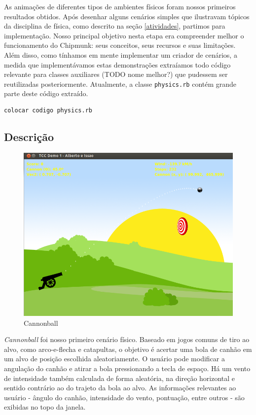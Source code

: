 As animações de diferentes tipos de ambientes físicos foram nossos primeiros resultados obtidos. Após desenhar alguns cenários simples que ilustravam tópicos da disciplina de física, como descrito na seção \ref{atividades}, partimos para implementação. Nosso principal objetivo nesta etapa era compreender melhor o funcionamento do Chipmunk: seus conceitos, seus recursos e suas limitações. \\

Além disso, como tínhamos em mente implementar um criador de cenários, a medida que implementávamos estas demonstrações extraíamos todo código relevante para classes auxiliares (TODO nome melhor?) que pudessem ser reutilizadas posteriormente. Atualmente, a classe {\tt physics.rb} contém grande parte deste código extraído. \\

\begin{lstlisting}
colocar codigo physics.rb
\end{lstlisting}

\subsection{Descrição}

\begin{figure}[H]
	\centering
	\includegraphics[scale=0.4]{images/cannonball.png}
	\caption{Cannonball}
	\hspace{0.5cm}
\end{figure}

\textit{Cannonball} foi nosso primeiro cenário físico. Baseado em jogos comuns de tiro ao alvo, como arco-e-flecha e catapultas, o objetivo é acertar uma bola de canhão em um alvo de posição escolhida aleatoriamente. O usuário pode modificar a angulação do canhão e atirar a bola pressionando a tecla de espaço. Há um vento de intensidade também calculada de forma aleatória, na direção horizontal e sentido contrário ao do trajeto da bola ao alvo. As informações relevantes ao usuário - ângulo do canhão, intensidade do vento, pontuação, entre outros - são exibidas no topo da janela. \\

